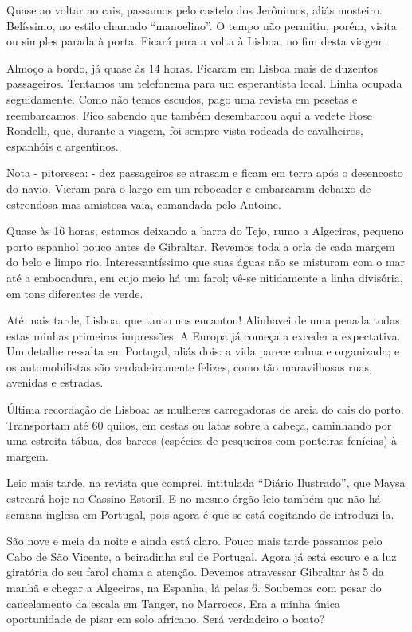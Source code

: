 Quase ao voltar ao cais, passamos pelo castelo dos Jerônimos, aliás mosteiro. Belíssimo, no estilo chamado “manoelino”. O tempo não permitiu, porém, visita ou simples parada à porta. Ficará para a volta à Lisboa, no fim desta viagem.

Almoço a bordo, já quase às 14 horas. Ficaram em Lisboa mais de duzentos passageiros. Tentamos um telefonema para um esperantista local. Linha ocupada seguidamente. Como não temos escudos, pago uma revista em pesetas e reembarcamos. Fico sabendo que também desembarcou aqui a vedete Rose Rondelli, que, durante a viagem, foi sempre vista rodeada de cavalheiros, espanhóis e argentinos.

Nota - pitoresca: - dez passageiros se atrasam e ficam em terra após o desencosto do navio. Vieram para o largo em um rebocador e embarcaram debaixo de estrondosa mas amistosa vaia, comandada pelo Antoine.

Quase às 16 horas, estamos deixando a barra do Tejo, rumo a Algeciras, pequeno porto espanhol pouco antes de Gibraltar. Revemos toda a orla de cada margem do belo e limpo rio. Interessantíssimo que suas águas não se misturam com o mar até a embocadura, em cujo meio há um farol; vê-se nitidamente a linha divisória, em tons diferentes de verde.

Até mais tarde, Lisboa, que tanto nos encantou! Alinhavei de uma penada todas estas minhas primeiras impressões. A Europa já começa a exceder a expectativa. Um detalhe ressalta em Portugal, aliás dois: a vida parece calma e organizada; e os automobilistas são verdadeiramente felizes, como tão maravilhosas ruas, avenidas e estradas.

Última recordação de Lisboa: as mulheres carregadoras de areia do cais do porto. Transportam até 60 quilos, em cestas ou latas sobre a cabeça, caminhando por uma estreita tábua, dos barcos (espécies de pesqueiros com ponteiras fenícias) à margem.

Leio mais tarde, na revista que comprei, intitulada “Diário Ilustrado”, que Maysa estreará hoje no Cassino Estoril. E no mesmo órgão leio também que não há semana inglesa em Portugal, pois agora é que se está cogitando de introduzi-la.

São nove e meia da noite e ainda está claro. Pouco mais tarde passamos pelo Cabo de São Vicente, a beiradinha sul de Portugal. Agora já está escuro e a luz giratória do seu farol chama a atenção. Devemos atravessar Gibraltar às 5 da manhã e chegar a Algeciras, na Espanha, lá pelas 6. Soubemos com pesar do cancelamento da escala em Tanger, no Marrocos. Era a minha única oportunidade de pisar em solo africano. Será verdadeiro o boato?

